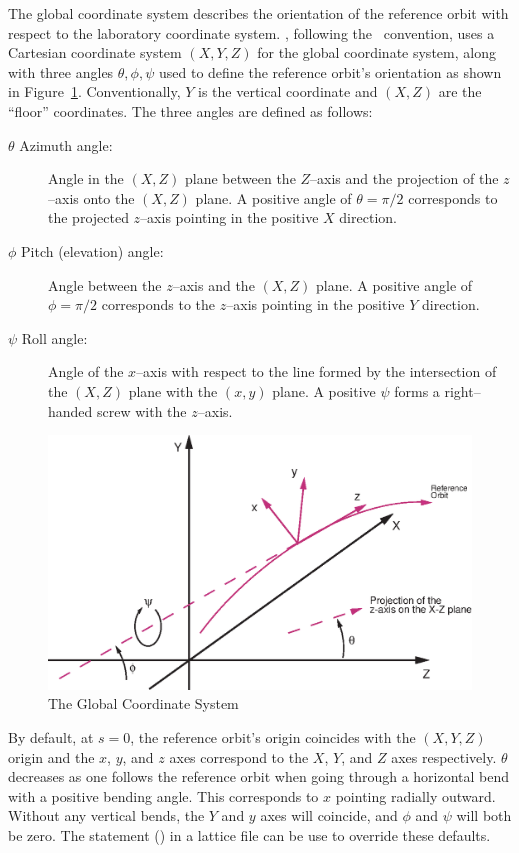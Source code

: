 The global coordinate system describes the orientation of the reference
orbit with respect to the laboratory coordinate system.  \bmad,
following the \mad\ convention, uses a Cartesian coordinate system
$(X, Y, Z)$ for the global coordinate system, along with three angles
$\theta, \phi, \psi$ used to define the reference orbit's orientation
as shown in Figure~\ref{f:global.coords}. Conventionally, $Y$ is the
vertical coordinate and $(X, Z)$ are the ``floor'' coordinates.  The
three angles are defined as follows:
\begin{description}
\item[$\theta$ Azimuth angle:] Angle in the $(X, Z)$ plane 
between the $Z$--axis and the projection of the $z$--axis onto the
$(X, Z)$ plane. A positive angle of $\theta = \pi/2$ corresponds to the
projected $z$--axis pointing in the positive $X$ direction.
\item[$\phi$ Pitch (elevation) angle:] Angle between the $z$--axis 
and the $(X,Z)$ plane. A positive angle of $\phi = \pi/2$ corresponds to
the $z$--axis pointing in the positive $Y$ direction.
\item[$\psi$ Roll angle:] Angle of the $x$--axis with respect 
to the line formed by the
intersection of the $(X, Z)$ plane with the $(x, y)$ plane. A
positive $\psi$ forms a right--handed screw with the $z$--axis.
\end{description}

\begin{figure}
\centering
\includegraphics{global-coords.eps}
\caption{The Global Coordinate System}
\label{f:global.coords}
\end{figure}

By default, at $s = 0$, the reference orbit's origin coincides with
the $(X, Y, Z)$ origin and the $x$, $y$, and $z$ axes correspond to
the $X$, $Y$, and $Z$ axes respectively. $\theta$ decreases as one
follows the reference orbit when going through a horizontal bend with
a positive bending angle. This corresponds to $x$ pointing radially
outward. Without any vertical bends, the $Y$ and $y$ axes will
coincide, and $\phi$ and $\psi$ will both be zero. The 
statement () in a lattice file can be use to
override these defaults.

